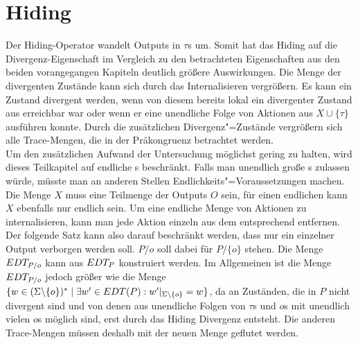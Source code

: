 \section{Hiding}

Der Hiding-Operator wandelt Outputs in $\tau$s um. Somit hat das Hiding auf die
Divergenz-Eigenschaft im Vergleich zu den betrachteten Eigenschaften aus den
beiden vorangegangen Kapiteln deutlich größere Auswirkungen. Die Menge der
divergenten Zustände kann sich durch das Internalisieren vergrößern. Es kann
ein Zustand divergent werden, wenn von diesem bereits lokal ein divergenter
Zustand aus erreichbar war oder wenn er eine unendliche Folge von Aktionen aus
$X\cup \{\tau\}$ ausführen konnte. Durch die zusätzlichen Divergenz"=Zustände
vergrößern sich alle Trace-Mengen, die in der Präkongruenz \DRel{} betrachtet
werden.\\
Um den zusätzlichen Aufwand der Untersuchung möglichst gering zu halten, wird
dieses Teilkapitel auf endliche \MEIO{}s beschränkt. Falls man unendlich große
\MEIO{}s zulassen würde, müsste man an anderen Stellen
Endlichkeits"=Voraussetzungen machen.\\
Die Menge $X$ muss eine Teilmenge der Outputs $O$ sein, für einen endlichen
\MEIO{} kann $X$ ebenfalls nur endlich sein. Um eine endliche Menge von
Aktionen zu internalisieren, kann man jede Aktion einzeln aus dem entsprechend
\MEIO{} entfernen. Der folgende Satz kann also darauf beschränkt werden, dass
nur ein einzelner Output verborgen werden soll. $P/o$ soll dabei für $P/\{o\}$
stehen. Die Menge $EDT _{P/o}$ kann aus $EDT _P$ konstruiert werden. Im
Allgemeinen ist die Menge $EDT _{P/o}$ jedoch größer wie die Menge $\{w\in
(\Sigma\backslash \{o\})^*\mid \exists w'\in EDT(P): w'|_{\Sigma\backslash
\{o\}} = w\}$, da an Zuständen, die in $P$ nicht divergent sind und von denen
aus unendliche Folgen von $\tau$s und $o$s mit unendlich vielen $o$s möglich
sind, erst durch das Hiding Divergenz entsteht. Die anderen Trace-Mengen müssen
deshalb mit der neuen \EDT{} Menge geflutet werden.


